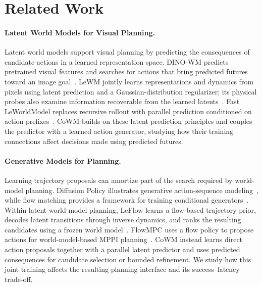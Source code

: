 \section{Related Work}
\label{sec:related}

\paragraph{Latent World Models for Visual Planning.}
Latent world models support visual planning by predicting the consequences of candidate actions in a learned representation space. DINO-WM predicts pretrained visual features and searches for actions that bring predicted futures toward an image goal~\cite{zhou2024dinowm}. LeWM jointly learns representations and dynamics from pixels using latent prediction and a Gaussian-distribution regularizer; its physical probes also examine information recoverable from the learned latents~\cite{maes2026lewm}. Fast LeWorldModel replaces recursive rollout with parallel prediction conditioned on action prefixes~\cite{gao2026fastlewm}. CoWM builds on these latent prediction principles and couples the predictor with a learned action generator, studying how their training connections affect decisions made using predicted futures.

\paragraph{Generative Models for Planning.}
Learning trajectory proposals can amortize part of the search required by world-model planning. Diffusion Policy illustrates generative action-sequence modeling~\cite{chi2023diffusion}, while flow matching provides a framework for training conditional generators~\cite{lipman2022flow}. Within latent world-model planning, LeFlow learns a flow-based trajectory prior, decodes latent transitions through inverse dynamics, and ranks the resulting candidates using a frozen world model~\cite{huang2026leflow}. FlowMPC uses a flow policy to propose actions for world-model-based MPPI planning~\cite{hamel2026flowmpc}. CoWM instead learns direct action proposals together with a parallel latent predictor and uses predicted consequences for candidate selection or bounded refinement. We study how this joint training affects the resulting planning interface and its success--latency trade-off.

